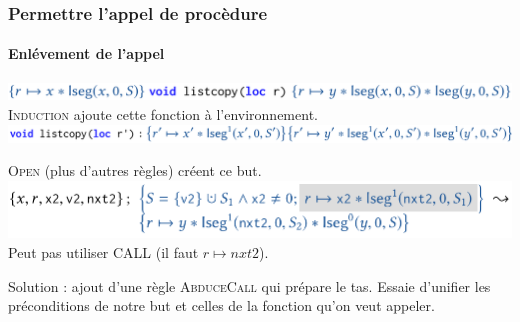 \documentclass[french]{beamer}
\begin{document}
\begin{frame}[fragile]
	\frametitle{Permettre l'appel de procèdure}
	\framesubtitle{Enlévement de l'appel}
   \includegraphics[width=\linewidth]{figures/abduction1.png}
   \textsc{Induction} ajoute cette fonction à l'environnement.
   \includegraphics[width=\linewidth]{figures/abduction2.png}
   \begin{center}
      \textsc{Open} (plus d'autres règles) créent ce but.
      \includegraphics[width=\linewidth]{figures/abduction3.png}
      Peut pas utiliser \textsc{CALL} (il faut $r \mapsto nxt2$).
   \end{center}
   
   Solution : ajout d'une règle \textsc{AbduceCall} qui \og prépare \fg le tas.
              Essaie d'unifier les préconditions de notre but et celles de la 
              fonction qu'on veut appeler.
\end{frame}
\end{document}
